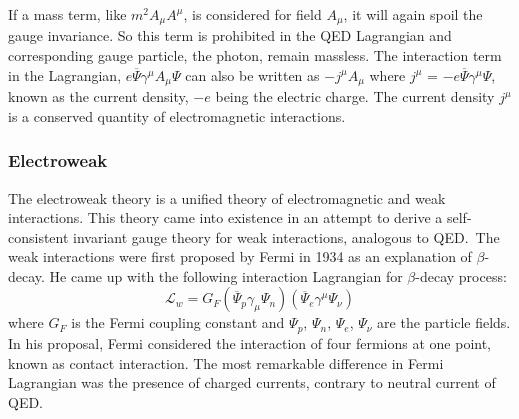 If a mass term, like $m^{2}A_{\mu}A^{\mu}$, is considered for field $A_{\mu}$, it will again spoil the gauge invariance. So this term is prohibited in the QED
Lagrangian and corresponding gauge particle, the photon, remain massless. The interaction term in the Lagrangian, $e\overline{\Psi}\gamma^{\mu}A_{\mu}{\Psi}$ can
also be written as $-j^{\mu}A_{\mu}$ where $j^{\mu}$ = $-e\overline{\Psi}\gamma^{\mu}{\Psi}$, known as the current density, $-e$ being the electric charge.
The current density $j^{\mu}$ is a conserved quantity of electromagnetic interactions.

\subsubsection{Electroweak}
The electroweak theory is a unified theory of electromagnetic and weak interactions. This theory came into existence in an attempt to derive a self-consistent
invariant gauge theory for weak interactions, analogous to QED.\ The weak interactions were first proposed by Fermi in 1934 as an explanation
of $\beta$-decay. He came up with the following interaction Lagrangian for $\beta$-decay process:
\begin{equation}
\mathcal{L}_{w} = G_{F}(\overline{\Psi}_{p}\gamma_{\mu}{\Psi}_{n})(\overline{\Psi}_{e}\gamma^{\mu}{\Psi}_{\nu})
\end{equation}
where $G_{F}$ is the Fermi coupling constant and ${\Psi}_{p}$, ${\Psi}_{n}$, ${\Psi}_{e}$, ${\Psi}_{\nu}$ are the particle fields.
In his proposal, Fermi considered the interaction of four fermions at one point, known as contact interaction. The most remarkable difference in Fermi Lagrangian
was the presence of charged currents, contrary to neutral current of QED.\

